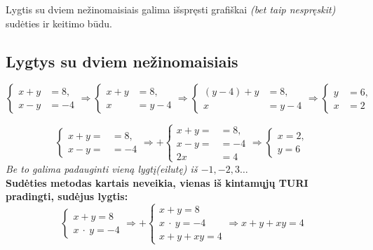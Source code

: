 \documentclass[fleqn]{article} %
\begin{document}
Lygtis su dviem nežinomaisiais galima išspręsti grafiškai \textit{(bet taip nespręskit)} sudėties ir keitimo būdu.

\subsection{Lygtys su dviem nežinomaisiais}
\begin{equation}
    \begin{cases}
        x + y &= 8, \\
        x - y &= -4
    \end{cases}
    \Rightarrow
    \begin{cases}
        x + y &= 8, \\
        x     &= y - 4
    \end{cases}
    \Rightarrow
    \begin{cases}
        (y - 4) + y &= 8, \\
        x           &= y - 4
    \end{cases}
    \Rightarrow
    \begin{cases}
        y &= 6, \\
        x &= 2
    \end{cases}
\end{equation}

\begin{equation}
    \begin{cases}
        x + y = &= 8, \\
        x - y = &= -4
    \end{cases}
    \Rightarrow +
    \begin{cases}
        x + y = &= 8, \\
        x - y = &= -4 \\
        \hline
        2x &= 4 
    \end{cases}
    \Rightarrow
    \begin{cases}
        x = 2, \\
        y = 6
    \end{cases}
\end{equation}
\textit{Be to galima padauginti vieną lygtį(eilutę) iš $-1, -2, 3 \dots$} \\
\textbf{Sudėties metodas kartais neveikia, vienas iš kintamųjų TURI pradingti, sudėjus lygtis:}
\begin{equation}
    \begin{cases}
        x + y = 8 \\
        x\ \cdot\ y = -4  
    \end{cases}
    \Rightarrow +
    \begin{cases}
        x + y = 8 \\
        x\ \cdot\ y = -4 \\
        \hline
        x + y + xy = 4
    \end{cases}
    \Rightarrow
    x + y + xy = 4
\end{equation}
\end{document}
